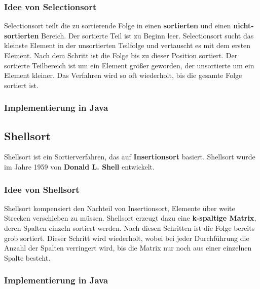 \documentclass[11pt, a4paper, titlepage, oneside]{article}
\renewcommand{\emph}{\textbf}
\begin{document}
	\subsubsection{Idee von Selectionsort}
	
	Selectionsort teilt die zu sortierende Folge in einen \emph{sortierten} und einen \emph{nicht-sor\-{}tier\-{}ten} Bereich. Der sortierte Teil ist zu Beginn leer. Selectionsort sucht das kleinste Element in der unsortierten Teilfolge und vertauscht es mit dem ersten Element. Nach dem Schritt ist die Folge bis zu dieser Position sortiert. Der sortierte Teilbereich ist um ein Element größer geworden, der unsortierte um ein Element kleiner. Das Verfahren wird so oft wiederholt, bis die gesamte Folge sortiert ist.
	
	\subsubsection{Implementierung in Java}
	
	
	
	\subsection{Shellsort}
	
	Shellsort ist ein Sortierverfahren, das auf \emph{Insertionsort} basiert. Shellsort wurde im Jahre 1959 von \emph{Donald L. Shell} entwickelt.
	
	\subsubsection{Idee von Shellsort}
	
	Shellsort kompensiert den Nachteil von Insertionsort, Elemente über weite Strecken verschieben zu müssen. Shellsort erzeugt dazu eine \emph{k-spaltige Matrix}, deren Spalten einzeln sortiert werden. Nach diesen Schritten ist die Folge bereits grob sortiert. Dieser Schritt wird wiederholt, wobei bei jeder Durchführung die Anzahl der Spalten verringert wird, bis die Matrix nur noch aus einer einzelnen Spalte besteht.
	
	\subsubsection{Implementierung in Java}
	
	
	
\end{document}
